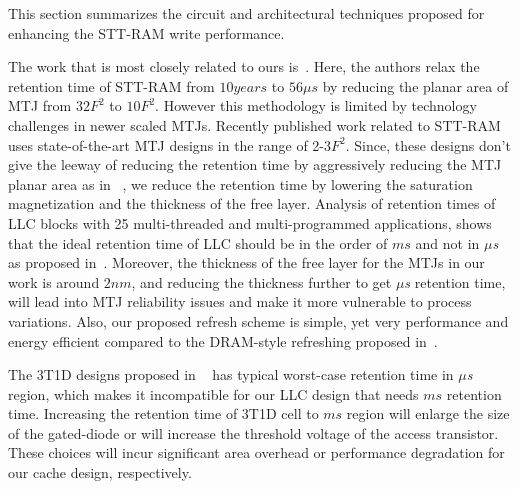 


This section summarizes the circuit and architectural techniques proposed for enhancing the STT-RAM
write performance.

The work that is most closely related to ours is~\cite{STTRAM:HPCA11}.
Here, the authors relax the retention time of STT-RAM from $10 years$ to $56 \mu s$ by
reducing the planar area of MTJ from $32F^2$ to $10F^2$. However this methodology is limited by 
technology challenges in newer scaled MTJs. Recently published work related to
STT-RAM~\cite{STTRAM:EDL11,STTRAM:Qualcomm09,STTRAM:Grandis11}
uses state-of-the-art MTJ designs in the range of 2-3$F^2$. Since, these designs don't give the
leeway of reducing the retention time by aggressively reducing the MTJ planar area as in~\cite{STTRAM:HPCA11} , we reduce the retention time by lowering the saturation magnetization and the thickness of the free layer. Analysis of retention times of LLC blocks with 25 multi-threaded and multi-programmed applications, shows that
the ideal retention time of LLC should be in the order of $ms$ and not in {\it $\mu$s} as proposed
in~\cite{STTRAM:HPCA11}. Moreover, the thickness of the free layer for the MTJs in our work is 
around $2nm$, and reducing the thickness further
to get {\it $\mu$s} retention time, will lead into MTJ reliability issues
and make it more vulnerable to process variations. Also, our proposed refresh scheme is simple, yet very performance and energy efficient compared to the DRAM-style refreshing proposed in~\cite{STTRAM:HPCA11}.

The 3T1D designs proposed in ~\cite{3T-brooks} has typical worst-case retention time in {\it $\mu$s} region, which makes it incompatible for our LLC design that needs $ms$ retention time. Increasing the retention time of 3T1D cell to $ms$ region will enlarge the size of the gated-diode or will increase the threshold voltage of the access transistor. These choices will incur significant area overhead or performance degradation for our cache design, respectively. 


